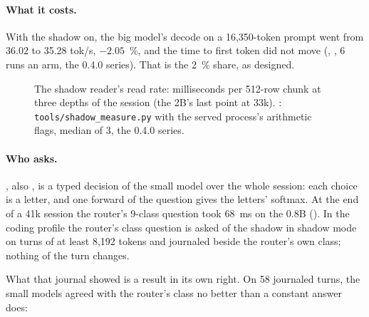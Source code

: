 \paragraph{What it costs.} With the shadow on, the big model's decode on a 16,350-token prompt went from 36.02 to 35.28 tok/s, $-2.05$~\%, and the time to first token did not move (\measured, , 6 runs an arm, the 0.4.0 series). That is the 2~\% share, as designed.

\begin{figure}[htbp]
\centering
{}
\caption[The shadow reader's read rate]{The shadow reader's read rate: milliseconds per 512-row chunk at three depths of the session (the 2B's last point at 33k). \measured: \texttt{tools/shadow\_measure.py} with the served process's arithmetic flags, median of 3, the 0.4.0 series.}\label{fig:shadow-rate}
\end{figure}

\paragraph{Who asks.} , also , is a typed decision of the small model over the whole session: each choice is a letter, and one forward of the question gives the letters' softmax. At the end of a 41k session the router's 9-class question took 68~ms on the 0.8B (\measured). In the coding profile the router's class question is asked of the shadow in shadow mode on turns of at least 8,192 tokens and journaled beside the router's own class; nothing of the turn changes.

What that journal showed is a result in its own right. On 58 journaled turns, the small models agreed with the router's class no better than a constant answer does:

